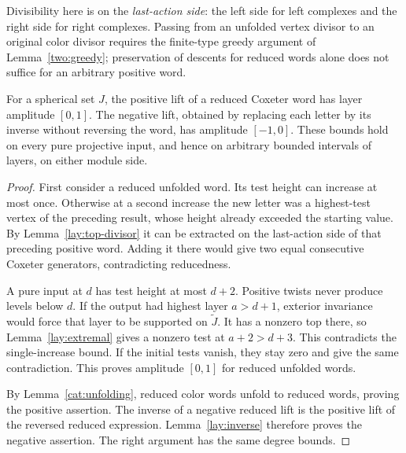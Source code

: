 \begin{remark}
Divisibility here is on the \emph{last-action side}: the left side for
left complexes and the right side for right complexes.  Passing from
an unfolded vertex divisor to an original color divisor requires the
finite-type greedy argument of Lemma~\ref{two:greedy}; preservation of
descents for reduced words alone does not suffice for an arbitrary
positive word.
\end{remark}

\begin{corollary}\label{lay:reduced}
For a spherical set $J$, the positive lift of a reduced Coxeter word
has layer amplitude $[0,1]$.  The negative lift, obtained by replacing
each letter by its inverse without reversing the word, has amplitude
$[-1,0]$.  These bounds hold on every pure projective input, and hence
on arbitrary bounded intervals of layers, on either module side.
\end{corollary}

\begin{proof}
First consider a reduced unfolded word.  Its test height can increase
at most once.  Otherwise at a second increase the new letter was a
highest-test vertex of the preceding result, whose height already
exceeded the starting value.  By Lemma~\ref{lay:top-divisor} it can be
extracted on the last-action side of that preceding positive word.
Adding it there would give two equal consecutive Coxeter generators,
contradicting reducedness.

A pure input at $d$ has test height at most $d+2$.  Positive twists
never produce levels below $d$.  If the output had highest layer
$a>d+1$, exterior invariance would force that layer to be supported on
$\widetilde J$.  It has a nonzero top there, so
Lemma~\ref{lay:extremal} gives a nonzero test at $a+2>d+3$.
This contradicts the single-increase bound.  If the initial tests
vanish, they stay zero and give the same contradiction.  This proves
amplitude $[0,1]$ for reduced unfolded words.

By Lemma~\ref{cat:unfolding}, reduced color words unfold to reduced
words, proving the positive assertion.  The inverse of a negative
reduced lift is the positive lift of the reversed reduced expression.
Lemma~\ref{lay:inverse} therefore proves the negative assertion.
The right argument has the same degree bounds.
\end{proof}
